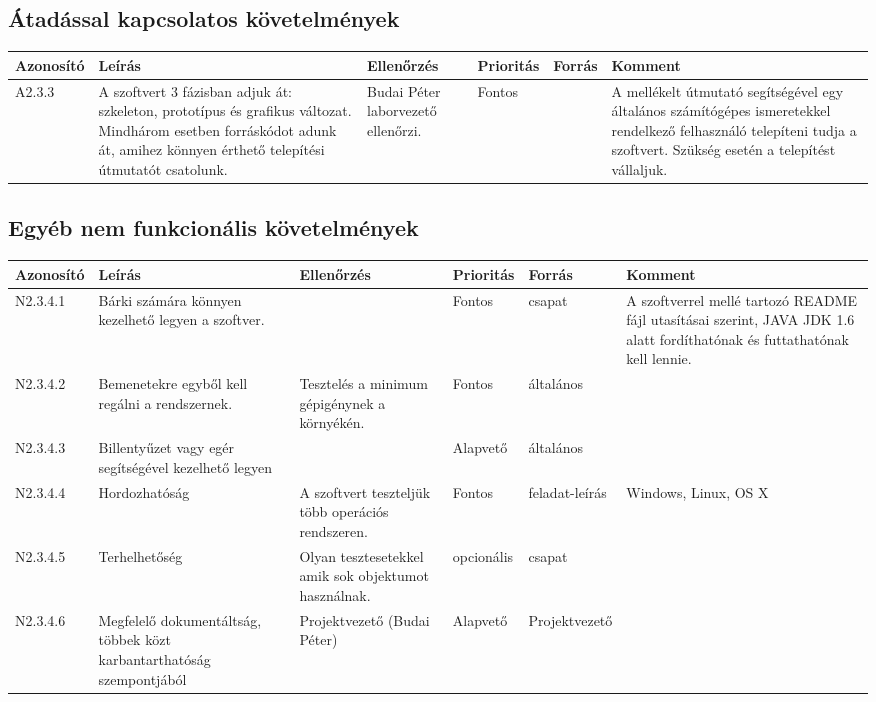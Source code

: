 \subsection{Átadással kapcsolatos követelmények}


\begin{longtable}{| l | p{4cm} | p{2.5cm} | l | l | p{3.5cm} |}
\hline
\textbf{Azonosító}   & \textbf{Leírás} & \textbf{Ellenőrzés} & \textbf{Prioritás} & \textbf{Forrás} & \textbf{Komment} \tabularnewline
\hline\hline
A2.3.3
&
A szoftvert 3 fázisban adjuk át: szkeleton, prototípus és grafikus változat. Mindhárom esetben forráskódot adunk át, amihez könnyen érthető telepítési útmutatót csatolunk.
&
Budai Péter laborvezető ellenőrzi.
&
Fontos
&
&
A mellékelt útmutató segítségével egy általános számítógépes ismeretekkel rendelkező felhasználó telepíteni tudja a szoftvert. Szükség esetén a telepítést vállaljuk. 

\tabularnewline
\hline
\end{longtable}

\subsection{Egyéb nem funkcionális követelmények}

\begin{longtable}{| l | p{3.5cm} |p{2.5cm} | l | l | p{3cm} |}
\hline
\textbf{Azonosító}   & \textbf{Leírás} & \textbf{Ellenőrzés} & \textbf{Prioritás} & \textbf{Forrás} & \textbf{Komment} \tabularnewline
\hline\hline
N2.3.4.1
&
Bárki számára könnyen kezelhető legyen a szoftver.
&
&
Fontos
&
csapat
&
A szoftverrel mellé tartozó README fájl utasításai szerint, JAVA JDK 1.6 alatt fordíthatónak és futtathatónak kell lennie.\tabularnewline
\hline
N2.3.4.2
&
Bemenetekre egyből kell regálni a rendszernek.
&
Tesztelés a minimum gépigénynek a környékén.
&
Fontos
&
általános
&	
\tabularnewline
\hline
N2.3.4.3
&
Billentyűzet vagy egér segítségével kezelhető legyen
&
&
Alapvető
&
általános
&
\tabularnewline
\hline
N2.3.4.4
&
Hordozhatóság
&
A szoftvert teszteljük több operációs rendszeren.
&
Fontos
&
feladat-leírás
&
Windows, Linux, OS X
\tabularnewline
\hline
N2.3.4.5
&
Terhelhetőség
&
Olyan tesztesetekkel amik sok objektumot használnak.
&
opcionális
&
csapat
&
\tabularnewline
\hline
N2.3.4.6
&
Megfelelő dokumentáltság, többek közt karbantarthatóság szempontjából
&
Projektvezető (Budai Péter)
&
Alapvető
&
Projektvezető
&
 \tabularnewline
\hline

\end{longtable}



